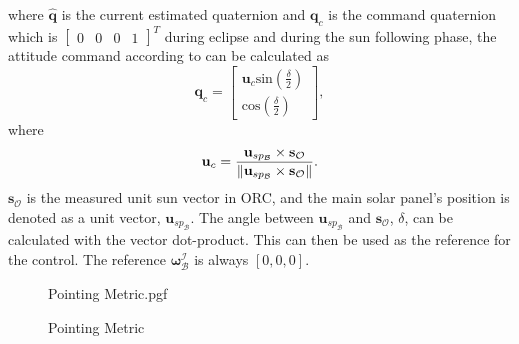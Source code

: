 where $\hat{\mathbf{q}}$ is the current estimated quaternion and $\mathbf{q}_{c}$ is the command quaternion which is $\begin{bmatrix}
0 & 0 & 0& 1
\end{bmatrix}^T$ during eclipse and during the sun following phase, the attitude command according to \cite{chen2000ground} can be calculated as 
\begin{equation}
\mathbf{q}_c = \begin{bmatrix}
\mathbf{u}_c \text{sin}(\frac{\delta}{2}) \\
\text{cos}(\frac{\delta}{2})
\end{bmatrix},
\end{equation}
where 
\begin{equation}
\mathbf{u}_c = \frac{\mathbf{u}_{sp_\mathcal{B}} \times \mathbf{s}_\mathcal{O}}{\left\lVert\mathbf{u}_{sp_\mathcal{B}} \times \mathbf{s}_\mathcal{O}\right\rVert}.
\end{equation}
$\mathbf{s}_\mathcal{O}$ is the measured unit sun vector in ORC, and the main solar panel's position is denoted as a unit vector, $\mathbf{u}_{sp_\mathcal{B}}$. The angle between $\mathbf{u}_{sp_\mathcal{B}}$ and $\mathbf{s}_\mathcal{O}$, $\delta$, can be calculated with the vector dot-product. This can then be used as the reference for the control. The reference $\boldsymbol{\omega}_{\mathcal{B}}^{\mathcal{I}}$ is always $[0, 0, 0]$. 

\begin{figure}[!htb]  
\centering
\def\pgfwidth{10cm}
{Pointing Metric.pgf}

\caption{Pointing Metric}
\label{fig:Pointing Metric}
\end{figure}

